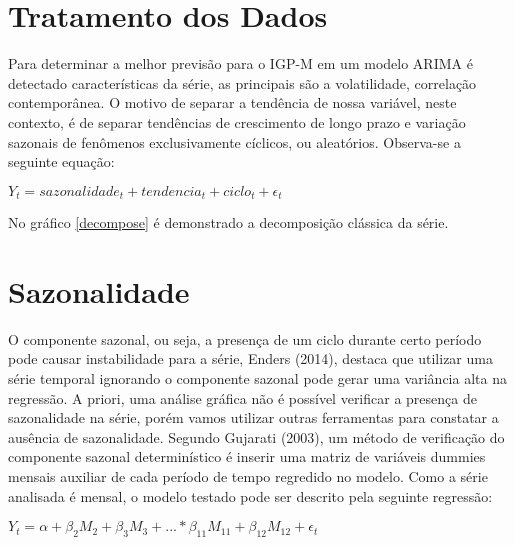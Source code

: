 \documentclass[a4paper,12pt,oneside,titlepage]{article}
\begin{document}
\section*{Tratamento dos Dados}

Para determinar a melhor previsão para o IGP-M em um modelo ARIMA é
detectado características da série, as principais são a volatilidade,
correlação contemporânea. O motivo de separar a tendência de nossa
variável, neste contexto, é de separar tendências de crescimento de
longo prazo e variação sazonais de fenômenos exclusivamente cíclicos,
ou aleatórios. Observa-se a seguinte equação:

\begin{center}

$ Y_t = sazonalidade_t + tendencia_t + ciclo_t + \epsilon_t $

\end{center}




No gráfico \ref{decompose} é demonstrado a decomposição clássica da
série.


\fontsize{10pt}{\baselineskip}




\section*{Sazonalidade}

O componente sazonal, ou seja, a presença de um ciclo durante
certo período pode causar instabilidade para a série, Enders (2014),
destaca que utilizar uma série temporal ignorando o componente
sazonal pode gerar uma variância alta na regressão. A priori, uma
análise gráfica não é possível verificar a presença de sazonalidade na
série, porém vamos utilizar outras ferramentas para constatar a
ausência de sazonalidade. Segundo Gujarati (2003), um método de
verificação do componente sazonal determinístico é inserir uma matriz
de variáveis dummies mensais auxiliar de cada período de tempo
regredido no modelo. Como a série analisada é mensal, o modelo
testado pode ser descrito pela seguinte regressão:
\begin{center}

$ Y_t = \alpha + \beta_2M_2  + \beta_3M_3  + ... * \beta_11M_11  + \beta_12M_12  + \epsilon_t $

\end{center}
\end{document}
